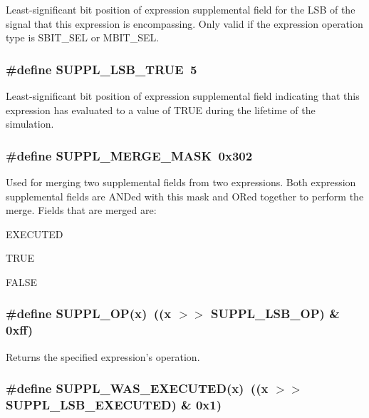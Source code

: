 Least-significant bit position of expression supplemental field for the LSB of the signal that this expression is encompassing. Only valid if the expression operation type is SBIT\_\-SEL or MBIT\_\-SEL. 
\subsubsection{\setlength{\rightskip}{0pt plus 5cm}\#define SUPPL\_\-LSB\_\-TRUE\ 5}\label{group__expr__suppl_a5}


Least-significant bit position of expression supplemental field indicating that this expression has evaluated to a value of TRUE during the lifetime of the simulation. 
\subsubsection{\setlength{\rightskip}{0pt plus 5cm}\#define SUPPL\_\-MERGE\_\-MASK\ 0x302}\label{group__expr__suppl_a8}


Used for merging two supplemental fields from two expressions. Both expression supplemental fields are ANDed with this mask and ORed together to perform the merge. Fields that are merged are:\begin{CompactItemize}
\item 
EXECUTED\item 
TRUE\item 
FALSE \end{CompactItemize}
\subsubsection{\setlength{\rightskip}{0pt plus 5cm}\#define SUPPL\_\-OP(x)\ ((x $>$$>$ SUPPL\_\-LSB\_\-OP) \& 0xff)}\label{group__expr__suppl_a14}


Returns the specified expression's operation. 
\subsubsection{\setlength{\rightskip}{0pt plus 5cm}\#define SUPPL\_\-WAS\_\-EXECUTED(x)\ ((x $>$$>$ SUPPL\_\-LSB\_\-EXECUTED) \& 0x1)}\label{group__expr__suppl_a9}


